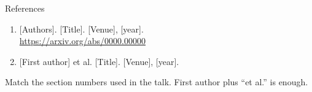 \documentclass[aspectratio=169,10pt,t]{beamer}
\begin{document}
\begin{frame}{References}
  {\small
  \begin{enumerate}
    \item {[Authors]. [Title]. [Venue], [year].}\\
      \url{https://arxiv.org/abs/0000.00000}
    \item {[First author] et al. [Title]. [Venue], [year].}
  \end{enumerate}}
  \vfill
  {\scriptsize\color{muted}
  Match the section numbers used in the talk. First author plus ``et al.'' is enough.}
\end{frame}
\end{document}
